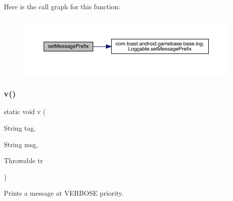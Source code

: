 Here is the call graph for this function\+:
\nopagebreak
\begin{figure}[H]
\begin{center}
\leavevmode
\includegraphics[width=350pt]{classcom_1_1toast_1_1android_1_1gamebase_1_1base_1_1log_1_1_logger_affc6772e3b03c3888d55dbe59e4891ae_cgraph}
\end{center}
\end{figure}
\mbox{\label{classcom_1_1toast_1_1android_1_1gamebase_1_1base_1_1log_1_1_logger_a464a3aa241c116031e6b07af63e0cecc}} 
\subsubsection{\texorpdfstring{v()}{v()}\hspace{0.1cm}{\footnotesize\ttfamily [1/2]}}
{\footnotesize\ttfamily static void v (\begin{DoxyParamCaption}\item[{String}]{tag,  }\item[{String}]{msg,  }\item[{Throwable}]{tr }\end{DoxyParamCaption})\hspace{0.3cm}{\ttfamily [static]}}



Prints a message at V\+E\+R\+B\+O\+SE priority. 


